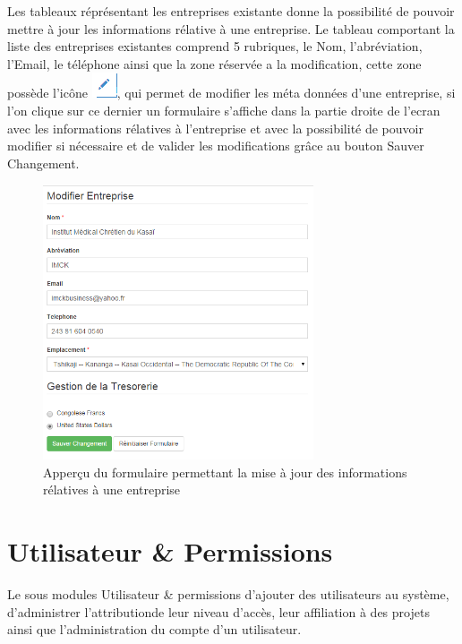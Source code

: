 \documentclass[12pt,a4paper]{report}
\begin{document}
Les tableaux réprésentant les entreprises existante donne la possibilité de pouvoir mettre à jour les informations rélative à une entreprise. Le tableau comportant la liste des entreprises existantes comprend 5 rubriques, le Nom, l'abréviation, l'Email, le téléphone ainsi que la zone réservée a la modification, cette zone possède l'icône \includegraphics[scale=0.7]{pic/EditUser.png}, qui permet de modifier les méta données d'une entreprise, si l'on clique sur ce dernier un formulaire s'affiche dans la partie droite de l'ecran avec les informations rélatives à l'entreprise et avec la possibilité de pouvoir modifier si nécessaire et de valider les modifications grâce au bouton Sauver Changement.
\begin{figure}[h]
\begin{center}
\includegraphics[width=8cm]{pic/ModEntreprise.png}
\end{center}
\caption{Apperçu du formulaire permettant la mise à jour des informations rélatives à une entreprise}
\label{Apperçu du formulaire permettant la mise à jour des informations rélatives à une entreprise}
\end{figure} 
\newpage
\section{Utilisateur \& Permissions}
Le sous modules Utilisateur \& permissions d'ajouter des utilisateurs au système, d'administrer l'attributionde leur niveau d'accès, leur affiliation à des projets ainsi que l'administration du compte d'un utilisateur.
\end{document}
